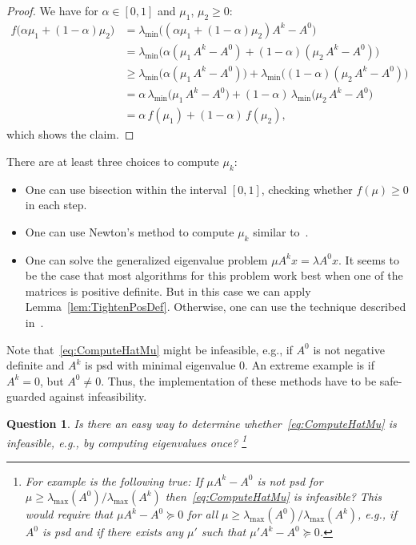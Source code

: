 \documentclass[10pt, a4paper]{article}
\newtheorem{question}[theorem]{Question}
\begin{document}
\begin{proof}
  We have for $\alpha \in [0,1]$ and $\mu_1$, $\mu_2 \geq 0$:
  \begin{align*}
    f\big(\alpha \mu_1 + (1 - \alpha) \mu_2\big)
    & = \lambda_{\min}\big((\alpha \mu_1 + (1 - \alpha) \mu_2) A^k - A^0\big)\\
    & = \lambda_{\min}\big(\alpha (\mu_1\, A^k - A^0) + (1 - \alpha) (\mu_2\, A^k - A^0)\big)\\
    & \geq \lambda_{\min}\big(\alpha (\mu_1\, A^k - A^0)\big) + \lambda_{\min}\big((1 - \alpha) (\mu_2\, A^k - A^0)\big)\\
    & = \alpha\, \lambda_{\min}\big(\mu_1\, A^k - A^0\big) + (1 - \alpha)\, \lambda_{\min}\big(\mu_2\, A^k - A^0\big)\\
    & = \alpha\, f(\mu_1) + (1 - \alpha)\, f(\mu_2),
  \end{align*}
  which shows the claim.
\end{proof}

\noindent
There are at least three choices to compute $\mu_k$:
\begin{itemize}[leftmargin=3ex]
\item One can use bisection within the interval $[0,1]$, checking whether
  $f(\mu) \geq 0$ in each step.
\item One can use Newton's method to compute $\mu_k$ similar
  to~\cite{Str16,HigSS16}.
\item One can solve the generalized eigenvalue problem $\mu A^k x = \lambda
  A^0 x$. It seems to be the case that most algorithms for this problem
  work best when one of the matrices is positive definite. But in this case
  we can apply Lemma~\ref{lem:TightenPosDef}. Otherwise, one can use the
  technique described in~\cite{Str16,HigSS16}. 
\end{itemize}

Note that~\eqref{eq:ComputeHatMu} might be infeasible, e.g., if $A^0$ is
not negative definite and $A^k$ is psd with minimal eigenvalue 0. An
extreme example is if $A^k = 0$, but $A^0 \neq 0$. Thus, the implementation
of these methods have to be safe-guarded against infeasibility.

\begin{question}
  Is there an easy way to determine whether~\eqref{eq:ComputeHatMu} is
  infeasible, e.g., by computing eigenvalues once?  \footnote{For example
    is the following true: If $\mu A^k - A^0$ is not psd for
    $\mu \geq \lambda_{\max}(A^0)/\lambda_{\max}(A^k)$ then~\eqref{eq:ComputeHatMu} is
    infeasible? This would require that $\mu A^k - A^0 \succeq 0$ for all
    $\mu \geq \lambda_{\max}(A^0) / \lambda_{\max}(A^k)$, e.g., if $A^0$ is
    psd and if there exists any $\mu'$ such that $\mu' A^k - A^0 \succeq 0$.}
\end{question}
\end{document}
